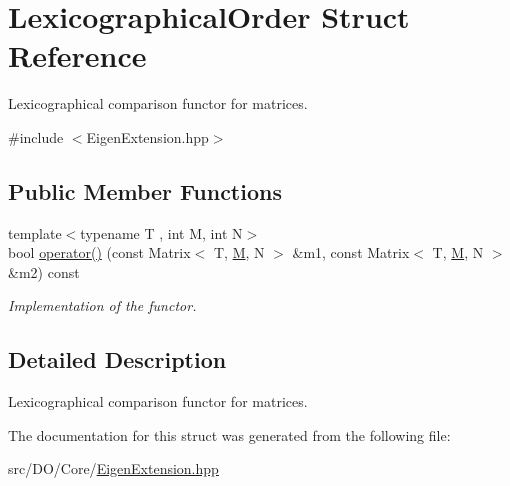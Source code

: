 \hypertarget{struct_d_o_1_1_lexicographical_order}{\section{Lexicographical\-Order Struct Reference}
\label{struct_d_o_1_1_lexicographical_order}
}


Lexicographical comparison functor for matrices.  




{\ttfamily \#include $<$Eigen\-Extension.\-hpp$>$}

\subsection*{Public Member Functions}
\begin{DoxyCompactItemize}
\item 
\hypertarget{struct_d_o_1_1_lexicographical_order_a41a012640ffdb9c89e7ed18d92e89443}{{\footnotesize template$<$typename T , int M, int N$>$ }\\bool \hyperlink{struct_d_o_1_1_lexicographical_order_a41a012640ffdb9c89e7ed18d92e89443}{operator()} (const Matrix$<$ T, \hyperlink{struct_d_o_1_1_m}{M}, N $>$ \&m1, const Matrix$<$ T, \hyperlink{struct_d_o_1_1_m}{M}, N $>$ \&m2) const }\label{struct_d_o_1_1_lexicographical_order_a41a012640ffdb9c89e7ed18d92e89443}

\begin{DoxyCompactList}\small\item\em Implementation of the functor. \end{DoxyCompactList}\end{DoxyCompactItemize}


\subsection{Detailed Description}
Lexicographical comparison functor for matrices. 

The documentation for this struct was generated from the following file\-:\begin{DoxyCompactItemize}
\item 
src/\-D\-O/\-Core/\hyperlink{_eigen_extension_8hpp}{Eigen\-Extension.\-hpp}\end{DoxyCompactItemize}
